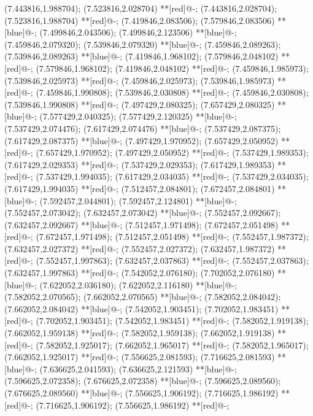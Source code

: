(7.443816,1.988704); (7.523816,2.028704) **[red]@{-};
(7.443816,2.028704); (7.523816,1.988704) **[red]@{-};
(7.419846,2.083506); (7.579846,2.083506) **[blue]@{-};
(7.499846,2.043506); (7.499846,2.123506) **[blue]@{-};
(7.459846,2.079320); (7.539846,2.079320) **[blue]@{-};
(7.459846,2.089263); (7.539846,2.089263) **[blue]@{-};
(7.419846,1.968102); (7.579846,2.048102) **[red]@{-};
(7.579846,1.968102); (7.419846,2.048102) **[red]@{-};
(7.459846,1.985973); (7.539846,2.025973) **[red]@{-};
(7.459846,2.025973); (7.539846,1.985973) **[red]@{-};
(7.459846,1.990808); (7.539846,2.030808) **[red]@{-};
(7.459846,2.030808); (7.539846,1.990808) **[red]@{-};
(7.497429,2.080325); (7.657429,2.080325) **[blue]@{-};
(7.577429,2.040325); (7.577429,2.120325) **[blue]@{-};
(7.537429,2.074476); (7.617429,2.074476) **[blue]@{-};
(7.537429,2.087375); (7.617429,2.087375) **[blue]@{-};
(7.497429,1.970952); (7.657429,2.050952) **[red]@{-};
(7.657429,1.970952); (7.497429,2.050952) **[red]@{-};
(7.537429,1.989353); (7.617429,2.029353) **[red]@{-};
(7.537429,2.029353); (7.617429,1.989353) **[red]@{-};
(7.537429,1.994035); (7.617429,2.034035) **[red]@{-};
(7.537429,2.034035); (7.617429,1.994035) **[red]@{-};
(7.512457,2.084801); (7.672457,2.084801) **[blue]@{-};
(7.592457,2.044801); (7.592457,2.124801) **[blue]@{-};
(7.552457,2.073042); (7.632457,2.073042) **[blue]@{-};
(7.552457,2.092667); (7.632457,2.092667) **[blue]@{-};
(7.512457,1.971498); (7.672457,2.051498) **[red]@{-};
(7.672457,1.971498); (7.512457,2.051498) **[red]@{-};
(7.552457,1.987372); (7.632457,2.027372) **[red]@{-};
(7.552457,2.027372); (7.632457,1.987372) **[red]@{-};
(7.552457,1.997863); (7.632457,2.037863) **[red]@{-};
(7.552457,2.037863); (7.632457,1.997863) **[red]@{-};
(7.542052,2.076180); (7.702052,2.076180) **[blue]@{-};
(7.622052,2.036180); (7.622052,2.116180) **[blue]@{-};
(7.582052,2.070565); (7.662052,2.070565) **[blue]@{-};
(7.582052,2.084042); (7.662052,2.084042) **[blue]@{-};
(7.542052,1.903451); (7.702052,1.983451) **[red]@{-};
(7.702052,1.903451); (7.542052,1.983451) **[red]@{-};
(7.582052,1.919138); (7.662052,1.959138) **[red]@{-};
(7.582052,1.959138); (7.662052,1.919138) **[red]@{-};
(7.582052,1.925017); (7.662052,1.965017) **[red]@{-};
(7.582052,1.965017); (7.662052,1.925017) **[red]@{-};
(7.556625,2.081593); (7.716625,2.081593) **[blue]@{-};
(7.636625,2.041593); (7.636625,2.121593) **[blue]@{-};
(7.596625,2.072358); (7.676625,2.072358) **[blue]@{-};
(7.596625,2.089560); (7.676625,2.089560) **[blue]@{-};
(7.556625,1.906192); (7.716625,1.986192) **[red]@{-};
(7.716625,1.906192); (7.556625,1.986192) **[red]@{-};

